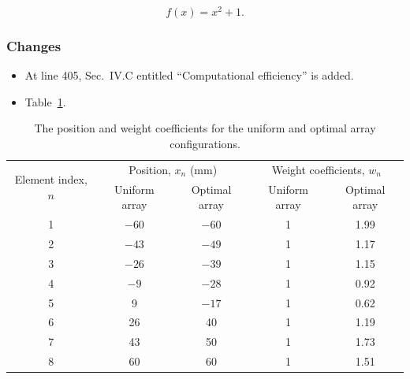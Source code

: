 \documentclass[12pt]{article}
\begin{document}
\begin{equation}
    f(x) = x^2 + 1.
    \label{eq:ex}
\end{equation}

\subsubsection*{Changes}
\begin{itemize}
    \item At line 405,
          Sec.~IV.C entitled ``Computational efficiency'' is added.
    \item Table~\ref{tab:2}.
\end{itemize}


\begin{table}
    \caption{The position and weight coefficients for the uniform and optimal array configurations.}
    \label{tab:2}
    \centering
    \begin{tabular}{ccccc}
        \toprule
        \multirow{2}{4em}{Element index, $n$ }
          & \multicolumn{2}{c}{Position, $x_n$ (mm)}
          & \multicolumn{2}{c}{Weight coefficients, $w_n$}
        \\
          & Uniform array                                  & Optimal array
          & Uniform array                                  & Optimal array            \\
        \midrule
        1 & $-60$                                          & $-60$         & 1 & 1.99 \\
        2 & $-43$                                          & $-49$         & 1 & 1.17 \\
        3 & $-26$                                          & $-39$         & 1 & 1.15 \\
        4 & $-9$                                           & $-28$         & 1 & 0.92 \\
        5 & 9                                              & $-17$         & 1 & 0.62 \\
        6 & 26                                             & 40            & 1 & 1.19 \\
        7 & 43                                             & 50            & 1 & 1.73 \\
        8 & 60                                             & 60            & 1 & 1.51 \\
        \bottomrule
    \end{tabular}
\end{table}
\end{document}
